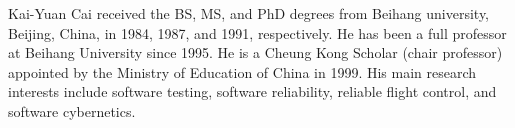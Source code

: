 \documentclass[10pt,journal,compsoc]{IEEEtran}
\begin{document}
\begin{IEEEbiography}{Kai-Yuan Cai} received the BS, MS, and PhD degrees from Beihang university, Beijing, China, in 1984, 1987, and 1991, respectively. He has been a full professor at Beihang University since 1995. He is a Cheung Kong Scholar (chair professor) appointed by the Ministry of Education of China in 1999. His main research interests include software testing, software reliability, reliable flight control, and software cybernetics.
\end{IEEEbiography}
\end{document}

